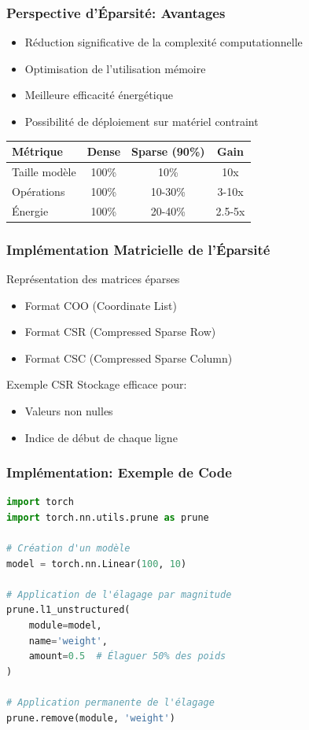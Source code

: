 \documentclass[10pt]{beamer}
\begin{document}
\begin{frame}
\frametitle{Perspective d'Éparsité: Avantages}
\begin{itemize}
    \item Réduction significative de la complexité computationnelle
    \item Optimisation de l'utilisation mémoire
    \item Meilleure efficacité énergétique
    \item Possibilité de déploiement sur matériel contraint
    \par\end{itemize}

\begin{center}
\begin{tabular}{lccc}
\toprule
\textbf{Métrique} & \textbf{Dense} & \textbf{Sparse (90\%)} & \textbf{Gain} \\
\midrule
Taille modèle & 100\% & 10\% & 10x \\
Opérations & 100\% & 10-30\% & 3-10x \\
Énergie & 100\% & 20-40\% & 2.5-5x \\
\bottomrule
\end{tabular}
\end{center}
\end{frame}

\begin{frame}
\frametitle{Implémentation Matricielle de l'Éparsité}
\begin{block}{Représentation des matrices éparses}
\begin{itemize}
    \item Format COO (Coordinate List)
    \item Format CSR (Compressed Sparse Row)
    \item Format CSC (Compressed Sparse Column)
\end{itemize}
\end{block}

\begin{exampleblock}{Exemple CSR}
Stockage efficace pour:
\begin{itemize}
    \item Valeurs non nulles
    \item Indice de début de chaque ligne
\end{itemize}
\end{exampleblock}
\end{frame}

\begin{frame}[fragile]
\frametitle{Implémentation: Exemple de Code}
\begin{lstlisting}[language=Python]
import torch
import torch.nn.utils.prune as prune

# Création d'un modèle
model = torch.nn.Linear(100, 10)

# Application de l'élagage par magnitude
prune.l1_unstructured(
    module=model,
    name='weight',
    amount=0.5  # Élaguer 50% des poids
)

# Application permanente de l'élagage
prune.remove(module, 'weight')
\end{lstlisting}
\end{frame}
\end{document}
